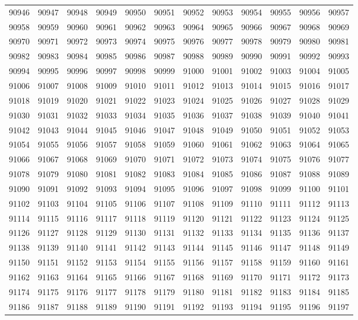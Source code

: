 \begin{center}
\begin{longtable}{llllllllllll}
90946 &90947 &90948 &90949 &90950 &90951 &90952 &90953 &90954 &90955 &90956 &90957 \\
90958 &90959 &90960 &90961 &90962 &90963 &90964 &90965 &90966 &90967 &90968 &90969 \\
90970 &90971 &90972 &90973 &90974 &90975 &90976 &90977 &90978 &90979 &90980 &90981 \\
90982 &90983 &90984 &90985 &90986 &90987 &90988 &90989 &90990 &90991 &90992 &90993 \\
90994 &90995 &90996 &90997 &90998 &90999 &91000 &91001 &91002 &91003 &91004 &91005 \\
91006 &91007 &91008 &91009 &91010 &91011 &91012 &91013 &91014 &91015 &91016 &91017 \\
91018 &91019 &91020 &91021 &91022 &91023 &91024 &91025 &91026 &91027 &91028 &91029 \\
91030 &91031 &91032 &91033 &91034 &91035 &91036 &91037 &91038 &91039 &91040 &91041 \\
91042 &91043 &91044 &91045 &91046 &91047 &91048 &91049 &91050 &91051 &91052 &91053 \\
91054 &91055 &91056 &91057 &91058 &91059 &91060 &91061 &91062 &91063 &91064 &91065 \\
91066 &91067 &91068 &91069 &91070 &91071 &91072 &91073 &91074 &91075 &91076 &91077 \\
91078 &91079 &91080 &91081 &91082 &91083 &91084 &91085 &91086 &91087 &91088 &91089 \\
91090 &91091 &91092 &91093 &91094 &91095 &91096 &91097 &91098 &91099 &91100 &91101 \\
91102 &91103 &91104 &91105 &91106 &91107 &91108 &91109 &91110 &91111 &91112 &91113 \\
91114 &91115 &91116 &91117 &91118 &91119 &91120 &91121 &91122 &91123 &91124 &91125 \\
91126 &91127 &91128 &91129 &91130 &91131 &91132 &91133 &91134 &91135 &91136 &91137 \\
91138 &91139 &91140 &91141 &91142 &91143 &91144 &91145 &91146 &91147 &91148 &91149 \\
91150 &91151 &91152 &91153 &91154 &91155 &91156 &91157 &91158 &91159 &91160 &91161 \\
91162 &91163 &91164 &91165 &91166 &91167 &91168 &91169 &91170 &91171 &91172 &91173 \\
91174 &91175 &91176 &91177 &91178 &91179 &91180 &91181 &91182 &91183 &91184 &91185 \\
91186 &91187 &91188 &91189 &91190 &91191 &91192 &91193 &91194 &91195 &91196 &91197 \\

\end{longtable}
\end{center}

